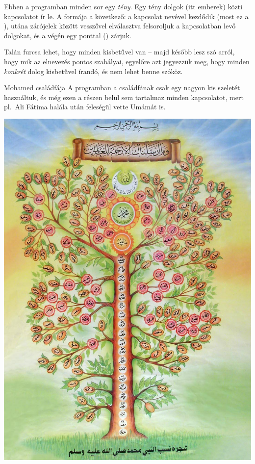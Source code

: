 Ebben a programban minden sor egy \emph{tény}. Egy
tény dolgok (itt emberek) közti kapcsolatot ír le. A
formája a következő: a kapcsolat nevével kezdődik
(most ez a ), utána zárójelek között
vesszővel elválasztva felsoroljuk a kapcsolatban
levő dolgokat, és a végén egy ponttal ()
zárjuk.

Talán furcsa lehet, hogy minden kisbetűvel van --
majd később lesz szó arról, hogy mik az elnevezés
pontos szabályai, egyelőre azt jegyezzük meg, hogy
minden \emph{konkrét} dolog kisbetűvel írandó, és
nem lehet benne szóköz.

\begin{infobox}{.75}{Mohamed családfája}
A programban a családfának csak egy nagyon kis
szeletét használtuk, és még ezen a részen belül
sem tartalmaz minden kapcsolatot, mert pl.~Ali
Fátima halála után feleségül vette Umámát is.

\includegraphics[width=\textwidth]{images/prophet-family.jpg}
\end{infobox}

